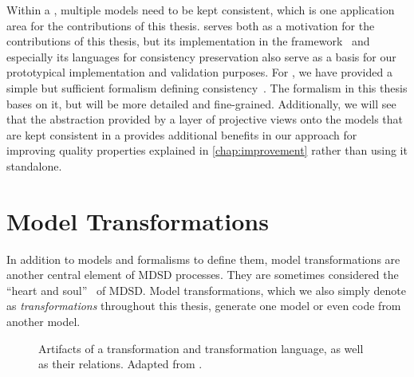 Within a \vsum, multiple models need to be kept consistent, which is one application area for the contributions of this thesis.
\vitruv serves both as a motivation for the contributions of this thesis, but its implementation in the \vitruv framework~\cite{vitruvFrameworkGithub} and especially its languages for consistency preservation also serve as a basis for our prototypical implementation and validation purposes.
For \vitruv, we have provided a simple but sufficient formalism defining consistency~\cite{klare2020Vitruv-JSS}.
The formalism in this thesis bases on it, but will be more detailed and fine-grained.
Additionally, we will see that the abstraction provided by a layer of projective views onto the models that are kept consistent in a \vsum provides additional benefits in our approach for improving quality properties explained in \autoref{chap:improvement} rather than using it standalone.


\section{Model Transformations}
\label{chap:foundations:transformations}

In addition to models and formalisms to define them, model transformations are another central element of \gls{MDSD} processes.
They are sometimes considered the \enquote{heart and soul}~\cite{sendall2003modelTransformation-Software} of \gls{MDSD}.
Model transformations, which we also simply denote as \emph{transformations} throughout this thesis, generate one model or even code from another model.

\begin{figure}
    \centering
    
    \caption[Transformation artifacts and their relations]{Artifacts of a transformation and transformation language, as well as their relations. Adapted from \cite[Fig.~9-5]{kleppe2003mdaExplained-Book}.}
    \label{fig:foundations:transformation}
\end{figure}

